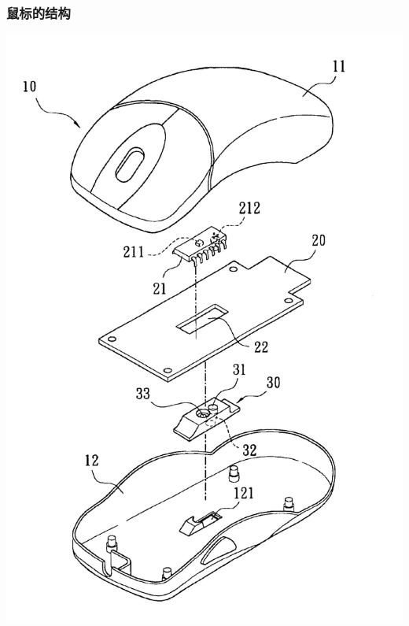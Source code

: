 \documentclass{beamer}
\begin{document}
\begin{frame}
	\frametitle{鼠标的结构}
	\begin{center}
	\includegraphics[scale=0.4]{images/6927759-0-large.jpg}~

\end{center}
\end{frame}
\end{document}
